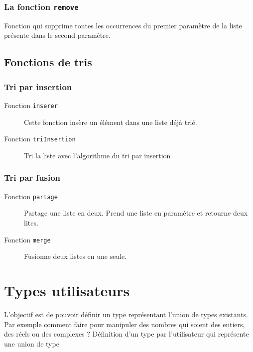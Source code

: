 \subsubsection{La fonction \texttt{remove}}
Fonction qui supprime toutes les occurrences du premier paramètre de la liste présente dans le second paramètre.


\subsection{Fonctions de tris}
\subsubsection{Tri par insertion}
\begin{description}
	\item[Fonction \texttt{inserer}] Cette fonction insère un élément dans une liste déjà trié.\\

	\item[Fonction \texttt{triInsertion}] Tri la liste avec l'algorithme du tri par insertion\\
		
\end{description}

\subsubsection{Tri par fusion}
\begin{description}
	\item[Fonction \texttt{partage}]Partage une liste en deux. Prend une liste en paramètre et retourne deux lites.
	
	\item[Fonction \texttt{merge}] Fusionne deux listes en une seule.
	
\end{description}

\section{Types utilisateurs}
L'objectif est de pouvoir définir un type représentant l'union de types existants.
Par exemple comment faire pour manipuler des nombres qui
soient des entiers, des réels ou des complexes ? Définition d'un type par l'utilisateur qui représente une
union de type

